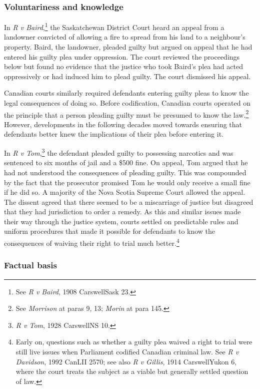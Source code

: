 \subsubsection{Voluntariness and knowledge}
 In \textit{R v Baird},\footnote{See \textit{R v Baird}, 1908 CarswellSask 23.} the Saskatchewan District Court heard an appeal from a landowner convicted of allowing a fire to spread from his land to a neighbour's property. Baird, the landowner, pleaded guilty but argued on appeal that he had entered his guilty plea under oppression. The court reviewed the proceedings below but found no evidence that the justice who took Baird's plea had acted oppressively or had induced him to plead guilty. The court dismissed his appeal. 

Canadian courts similarly required defendants entering guilty pleas to know the legal consequences of doing so. Before codification, Canadian courts operated on the principle that a person pleading guilty must be presumed to know the law.\footnote{See \textit{Morrison} at paras 9, 13; \textit{Morin} at para 145.} However, developments in the following decades moved towards ensuring that defendants better knew the implications of their plea before entering it. 

In \textit{R v Tom},\footnote{\textit{R v Tom}, 1928 CarswellNS 10.} the defendant pleaded guilty to possessing narcotics and was sentenced to six months of jail and a \$500 fine. On appeal, Tom argued that he had not understood the consequences of pleading guilty. This was compounded by the fact that the prosecutor promised Tom he would only receive a small fine if he did so. A majority of the Nova Scotia Supreme Court allowed the appeal. The dissent agreed that there seemed to be a miscarriage of justice but disagreed that they had jurisdiction to order a remedy. As this and similar issues made their way through the justice system, courts settled on predictable rules and uniform procedures that made it possible for defendants to know the consequences of waiving their right to trial much better.\footnote{Early on, questions such as whether a guilty plea waived a right to trial were still live issues when Parliament codified Canadian criminal law. See \textit{R v Davidson}, 1992 CanLII 2570; see also \textit{R v Gillis}, 1914 CarswellYukon 6, where the court treats the subject as a viable but generally settled question of law.}

\subsubsection{Factual basis}

